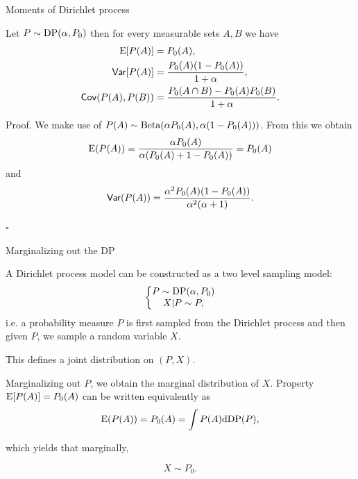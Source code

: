 \begin{frame}[allowframebreaks]{Moments of Dirichlet process}
	\begin{proposition}
Let $P\sim \text{DP}(\alpha, P_0)$ then for every measurable sets $A, B$ we have
\begin{align*}
    \mathrm{E}[ P(A)] &= P_0(A),\\
    \mathsf{Var}[P(A)] &= \frac{P_0(A)(1-P_0(A))}{1+\alpha},\\
    \mathsf{Cov}( P(A), P(B) )&=\frac{P_0(A \cap B) - P_0(A)P_0(B) }{1+\alpha}\label{Dir:Covariance}.
\end{align*}
\end{proposition}
\framebreak

\alert{Proof.}
We make use of  $P(A)\sim \text{Beta}(\alpha P_0(A), \alpha (1-P_0(A)))$. From this we obtain 
\begin{equation*}
    \mathrm{E} (P(A)) = \frac{\alpha P_0(A)}{\alpha( P_0(A) + 1 - P_0(A) )} = P_0(A)
\end{equation*}
and 
\begin{equation*}
    \mathsf{Var}(P(A))=\frac{\alpha^2 P_0(A)( 1-P_0(A) )}{\alpha^2 (\alpha + 1)}.
\end{equation*}

\hfill $\square$
\end{frame}


\begin{frame}{Marginalizing out the DP}

A Dirichlet process model can be constructed as a two level sampling model:
\begin{equation*}
    \left \{ \begin{matrix}
P \sim \text{DP}(\alpha, P_0)\\ 
X|P \sim P,
\end{matrix}\right.
\end{equation*}
i.e. a probability measure $P$ is first sampled from the Dirichlet process and then given  $P$, we sample a random variable $X$. 

This defines a \alert{joint} distribution on $(P,X)$. 

\pause

\textcolor{red2}{Marginalizing out $P$}, we obtain the marginal distribution of $X$. Property $\mathrm{E}[ P(A)] = P_0(A)$ can be written equivalently as
\begin{equation*}
    \mathrm{E}( P(A)) = P_0(A) = \int P(A)\mathrm{d} \text{DP}(P),
\end{equation*}

which yields that marginally,

$$X\sim P_0.$$

\end{frame}


